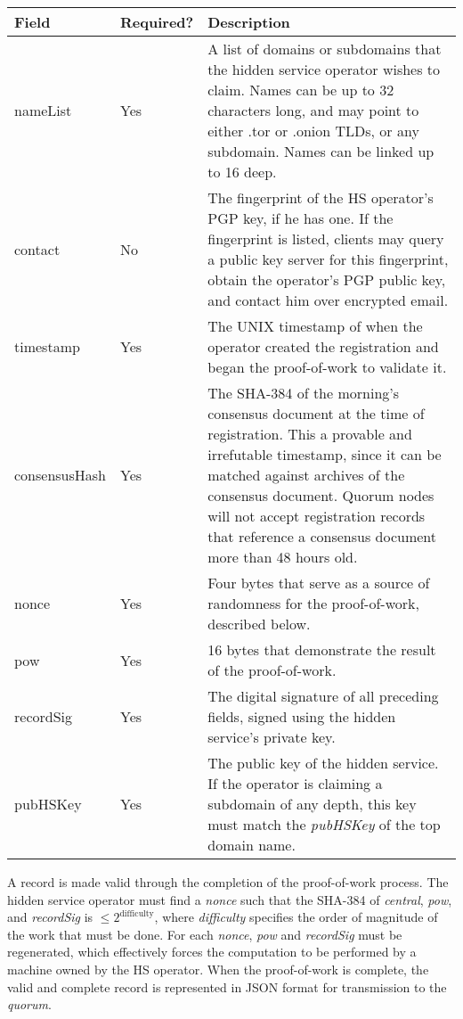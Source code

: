\begin{center}
    \begin{tabular}{ | l | l | p{9cm} |}
    \hline
    \textbf{Field} & \textbf{Required?} & \textbf{Description} \\ \hline
    nameList & Yes & A list of domains or subdomains that the hidden service operator wishes to claim. Names can be up to 32 characters long, and may point to either .tor or .onion TLDs, or any subdomain. Names can be linked up to 16 deep. \\ \hline
    contact & No & The fingerprint of the HS operator's PGP key, if he has one. If the fingerprint is listed, clients may query a public key server for this fingerprint, obtain the operator's PGP public key, and contact him over encrypted email. \\ \hline
	timestamp & Yes & The UNIX timestamp of when the operator created the registration and began the proof-of-work to validate it. \\ \hline
	consensusHash & Yes & The SHA-384 of the morning's consensus document at the time of registration. This a provable and irrefutable timestamp, since it can be matched against archives of the consensus document. Quorum nodes will not accept registration records that reference a consensus document more than 48 hours old. \\ \hline
	nonce & Yes & Four bytes that serve as a source of randomness for the proof-of-work, described below. \\ \hline
    pow & Yes & 16 bytes that demonstrate the result of the proof-of-work. \\ \hline
    recordSig & Yes & The digital signature of all preceding fields, signed using the hidden service's private key. \\ \hline
    pubHSKey & Yes & The public key of the hidden service. If the operator is claiming a subdomain of any depth, this key must match the \emph{pubHSKey} of the top domain name.\\ \hline
    \end{tabular}
\end{center}

A record is made valid through the completion of the proof-of-work process. The hidden service operator must find a \emph{nonce} such that the SHA-384 of \emph{central}, \emph{pow}, and \emph{recordSig} is $ \leq 2^\textrm{difficulty} $, where \emph{difficulty} specifies the order of magnitude of the work that must be done. For each \emph{nonce}, \emph{pow} and \emph{recordSig} must be regenerated, which effectively forces the computation to be performed by a machine owned by the HS operator. When the proof-of-work is complete, the valid and complete record is represented in JSON format for transmission to the \emph{quorum}.

